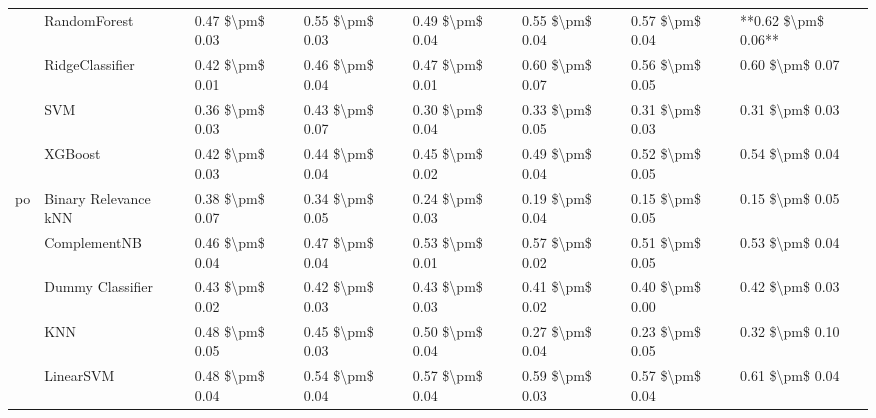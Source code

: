 \begin{tabular}{llllllll}
   & RandomForest &  0.47 \$\textbackslash pm\$ 0.03 &           0.55 \$\textbackslash pm\$ 0.03 &       0.49 \$\textbackslash pm\$ 0.04 &        0.55 \$\textbackslash pm\$ 0.04 &                         0.57 \$\textbackslash pm\$ 0.04 &  **0.62 \$\textbackslash pm\$ 0.06** \\
   & RidgeClassifier &  0.42 \$\textbackslash pm\$ 0.01 &           0.46 \$\textbackslash pm\$ 0.04 &       0.47 \$\textbackslash pm\$ 0.01 &        0.60 \$\textbackslash pm\$ 0.07 &                         0.56 \$\textbackslash pm\$ 0.05 &      0.60 \$\textbackslash pm\$ 0.07 \\
   & SVM &  0.36 \$\textbackslash pm\$ 0.03 &           0.43 \$\textbackslash pm\$ 0.07 &       0.30 \$\textbackslash pm\$ 0.04 &        0.33 \$\textbackslash pm\$ 0.05 &                         0.31 \$\textbackslash pm\$ 0.03 &      0.31 \$\textbackslash pm\$ 0.03 \\
   & XGBoost &  0.42 \$\textbackslash pm\$ 0.03 &           0.44 \$\textbackslash pm\$ 0.04 &       0.45 \$\textbackslash pm\$ 0.02 &        0.49 \$\textbackslash pm\$ 0.04 &                         0.52 \$\textbackslash pm\$ 0.05 &      0.54 \$\textbackslash pm\$ 0.04 \\
po & Binary Relevance kNN &  0.38 \$\textbackslash pm\$ 0.07 &           0.34 \$\textbackslash pm\$ 0.05 &       0.24 \$\textbackslash pm\$ 0.03 &        0.19 \$\textbackslash pm\$ 0.04 &                         0.15 \$\textbackslash pm\$ 0.05 &      0.15 \$\textbackslash pm\$ 0.05 \\
   & ComplementNB &  0.46 \$\textbackslash pm\$ 0.04 &           0.47 \$\textbackslash pm\$ 0.04 &       0.53 \$\textbackslash pm\$ 0.01 &        0.57 \$\textbackslash pm\$ 0.02 &                         0.51 \$\textbackslash pm\$ 0.05 &      0.53 \$\textbackslash pm\$ 0.04 \\
   & Dummy Classifier &  0.43 \$\textbackslash pm\$ 0.02 &           0.42 \$\textbackslash pm\$ 0.03 &       0.43 \$\textbackslash pm\$ 0.03 &        0.41 \$\textbackslash pm\$ 0.02 &                         0.40 \$\textbackslash pm\$ 0.00 &      0.42 \$\textbackslash pm\$ 0.03 \\
   & KNN &  0.48 \$\textbackslash pm\$ 0.05 &           0.45 \$\textbackslash pm\$ 0.03 &       0.50 \$\textbackslash pm\$ 0.04 &        0.27 \$\textbackslash pm\$ 0.04 &                         0.23 \$\textbackslash pm\$ 0.05 &      0.32 \$\textbackslash pm\$ 0.10 \\
   & LinearSVM &  0.48 \$\textbackslash pm\$ 0.04 &           0.54 \$\textbackslash pm\$ 0.04 &       0.57 \$\textbackslash pm\$ 0.04 &        0.59 \$\textbackslash pm\$ 0.03 &                         0.57 \$\textbackslash pm\$ 0.04 &      0.61 \$\textbackslash pm\$ 0.04 \\

\end{tabular}
